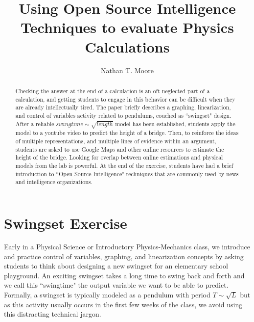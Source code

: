\documentclass[12pt]{iopart}
\begin{document}
\title[Using Open Source Intelligence Techniques to evaluate Physics Calculations]{Using Open Source Intelligence Techniques to evaluate Physics Calculations}

\author{Nathan T. Moore}

\address{
	Physics and General Engineering, 
	Winona State University,
	Winona, MN 55987 USA
}
\vspace{10pt}
\begin{indented}
\item[\today]
\end{indented}

\begin{abstract}
Checking the answer at the end of a calculation is an oft neglected part of a calculation, and getting students to engage in this behavior can be difficult when they are already intellectually tired. 
	The paper briefly describes a graphing, linearization, and control of variables activity related to pendulums, couched as ``swingset" design. 
	After a reliable $swingtime \sim \sqrt{length}$ model has been established, students apply the model to a youtube video to predict the height of a bridge. 
	Then, to reinforce the ideas of multiple representations, and multiple lines of evidence within an argument, students are asked to use Google Maps and other online resources to estimate the height of the bridge. 
	Looking for overlap between online estimations and physical models from the lab is powerful. 
	At the end of the exercise, students have had a brief introduction to ``Open Source Intelligence" techniques that are commonly used by news and intelligence organizations. 
\end{abstract}

%
%
%
% 
%



\section{Swingset Exercise}
Early in a Physical Science or Introductory Physics-Mechanics class, we introduce and practice control of variables, graphing, and linearization concepts by asking students to think about designing a new swingset for an elementary school playground.  
An exciting swingset takes a long time to swing back and forth and we call this ``swingtime" the output variable we want to be able to predict.
Formally, a swingset is typically modeled as a pendulum with period 
$T \sim \sqrt{L}$ \cite{openstax_pendulum} but as this activity usually occurs in the first few weeks of the class, we avoid using this distracting technical jargon.
\end{document}
